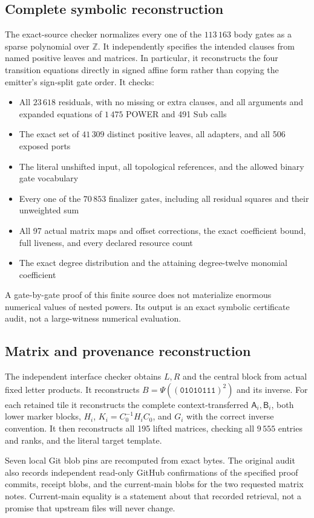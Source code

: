 \documentclass[11pt,letterpaper]{article}
\theoremstyle{definition}
\theoremstyle{remark}
\newcommand{\Z}{\mathbb Z}
\begin{document}
\subsection{Complete symbolic reconstruction}
The exact-source checker normalizes every one of the $113\,163$ body gates as a sparse polynomial over $\Z$. It independently specifies the intended clauses from named positive leaves and matrices. In particular, it reconstructs the four transition equations directly in signed affine form rather than copying the emitter's sign-split gate order. It checks:
\begin{itemize}
\item All $23\,618$ residuals, with no missing or extra clauses, and all arguments and expanded equations of $1\,475$ POWER and 491 Sub calls
\item The exact set of $41\,309$ distinct positive leaves, all adapters, and all 506 exposed ports
\item The literal unshifted input, all topological references, and the allowed binary gate vocabulary
\item Every one of the $70\,853$ finalizer gates, including all residual squares and their unweighted sum
\item All 97 actual matrix maps and offset corrections, the exact coefficient bound, full liveness, and every declared resource count
\item The exact degree distribution and the attaining degree-twelve monomial coefficient
\end{itemize}
A gate-by-gate proof of this finite source does not materialize enormous numerical values of nested powers. Its output is an exact symbolic certificate audit, not a large-witness numerical evaluation.

\subsection{Matrix and provenance reconstruction}
The independent interface checker obtains $L,R$ and the central block from actual fixed letter products. It reconstructs $B=\Psi((\texttt{01010111})^2)$ and its inverse. For each retained tile it reconstructs the complete context-transferred $\mathsf A_i,\mathsf B_i$, both lower marker blocks, $H_i$, $K_i=C_0^{-1}H_iC_0$, and $G_i$ with the correct inverse convention. It then reconstructs all 195 lifted matrices, checking all $9\,555$ entries and ranks, and the literal target template.

Seven local Git blob pins are recomputed from exact bytes. The original audit also records independent read-only GitHub confirmations of the specified proof commits, receipt blobs, and the current-main blobs for the two requested matrix notes. Current-main equality is a statement about that recorded retrieval, not a promise that upstream files will never change.
\end{document}
